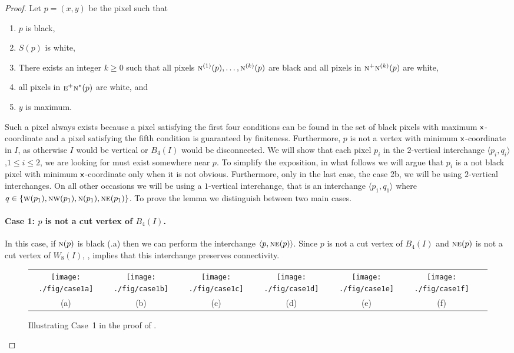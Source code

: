 \documentclass[lotsofwhite,charterfonts]{patmorin}
\newcommand{\N}{\textsc{n}}
\newcommand{\NE}{\textsc{ne}}
\newcommand{\E}{\textsc{e}}
\newcommand{\W}{\textsc{w}}
\newcommand{\NW}{\textsc{nw}}
\newcommand{\x}{\ensuremath{\protect\textup{\textsf{x}}}}
\newcommand{\ic}[2]{\langle #1,#2 \rangle}
\begin{document}
\begin{proof}
Let $p=(x,y)$ be the pixel such that
\begin{enumerate}
  \item $p$ is black, 
  \item $S(p)$ is white,
  \item There exists an integer $k\ge 0$ such that all pixels
	$\N^{(1)}(p),\ldots,\N^{(k)}(p)$ are black and 
        all pixels in $\N^{+}\N^{(k)}(p)$ are white,
  \item all pixels in $\E^+\N^*(p)$ are white, and
  \item $y$ is maximum.
\end{enumerate}
Such a pixel always exists because a pixel satisfying the first four conditions can be found in the set of black pixels with maximum \x-coordinate and a pixel satisfying the fifth condition is guaranteed by finiteness. Furthermore, $p$ is not a vertex with minimum \x-coordinate in $I$, as otherwise $I$ would be vertical or $B_4(I)$ would be disconnected. We will show that each pixel $p_i$ in the $2$-vertical interchange $\ic{p_i}{q_i}$,$1\leq i\leq 2$,  we are looking for must exist somewhere near $p$. To simplify the exposition, in what follows we will argue that $p_i$ is a not black pixel with minimum \x-coordinate only when it is not obvious. Furthermore, only in the last case, the case 2b, we will be using $2$-vertical interchanges. On all other occasions we will be using a $1$-vertical interchange, that is an interchange $\ic{p_1}{q_1}$ where $q\in\{\W(p_1),\NW(p_1),\N(p_1),\NE(p_1)\}$. To prove the lemma we distinguish between two main cases.


\paragraph{Case 1: $p$ is not a cut vertex of $B_4(I)$.}  In this
case, if $\N(p)$ is black (.a) then we can perform
the interchange $\ic{p}{\NE(p)}$.  Since $p$ is not a cut vertex of
$B_4(I)$ and $\NE(p)$ is not a cut vertex of $W_8(I)$,
, implies that this interchange preserves
connectivity.

\begin{figure}[htbp]
\begin{center}
\begin{tabular}{ccccccc}
\texttt{[image: ./fig/case1a]} & 
\texttt{[image: ./fig/case1b]} & 
\texttt{[image: ./fig/case1c]} & 
\texttt{[image: ./fig/case1d]} & 
\texttt{[image: ./fig/case1e]} & 
\texttt{[image: ./fig/case1f]} \\
(a) & (b) & (c) & (d) & (e) & (f)
\end{tabular}
\end{center}
\caption{Illustrating Case~1 in the proof of .}
\end{figure}



\end{proof}
\end{document}
